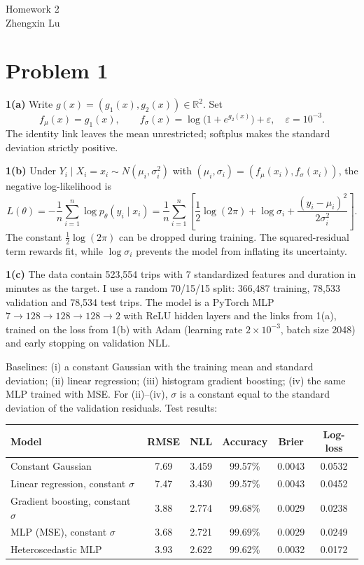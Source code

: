 \documentclass[11pt]{article}
\begin{document}
\begin{center}
{\Large Homework 2}\\[4pt]
Zhengxin Lu
\end{center}

\section*{Problem 1}

\textbf{1(a)}
Write $g(x)=(g_1(x),g_2(x))\in\mathbb{R}^2$. Set
\[
f_\mu(x)=g_1(x),\qquad f_\sigma(x)=\log\big(1+e^{g_2(x)}\big)+\varepsilon,\quad \varepsilon=10^{-3}.
\]
The identity link leaves the mean unrestricted; softplus makes the standard deviation strictly positive.

\textbf{1(b)}
Under $Y_i\mid X_i=x_i\sim N(\mu_i,\sigma_i^2)$ with $(\mu_i,\sigma_i)=(f_\mu(x_i),f_\sigma(x_i))$, the negative log-likelihood is
\[
L(\theta)=-\frac1n\sum_{i=1}^n\log p_\theta(y_i\mid x_i)
=\frac1n\sum_{i=1}^n\left[\frac12\log(2\pi)+\log\sigma_i+\frac{(y_i-\mu_i)^2}{2\sigma_i^2}\right].
\]
The constant $\frac12\log(2\pi)$ can be dropped during training. The squared-residual term rewards fit, while $\log\sigma_i$ prevents the model from inflating its uncertainty.

\textbf{1(c)}
The data contain 523,554 trips with 7 standardized features and duration in minutes as the target. I use a random 70/15/15 split: 366,487 training, 78,533 validation and 78,534 test trips. The model is a PyTorch MLP $7\to128\to128\to128\to2$ with ReLU hidden layers and the links from 1(a), trained on the loss from 1(b) with Adam (learning rate $2\times10^{-3}$, batch size 2048) and early stopping on validation NLL.

Baselines: (i) a constant Gaussian with the training mean and standard deviation; (ii) linear regression; (iii) histogram gradient boosting; (iv) the same MLP trained with MSE. For (ii)--(iv), $\sigma$ is a constant equal to the standard deviation of the validation residuals. Test results:

\begin{center}
\begin{tabular}{lccccc}
\toprule
Model & RMSE & NLL & Accuracy & Brier & Log-loss\\
\midrule
Constant Gaussian & 7.69 & 3.459 & 99.57\% & 0.0043 & 0.0532\\
Linear regression, constant $\sigma$ & 7.47 & 3.430 & 99.57\% & 0.0043 & 0.0452\\
Gradient boosting, constant $\sigma$ & 3.88 & 2.774 & 99.68\% & 0.0029 & 0.0238\\
MLP (MSE), constant $\sigma$ & 3.68 & 2.721 & 99.69\% & 0.0029 & 0.0249\\
Heteroscedastic MLP & 3.93 & 2.622 & 99.62\% & 0.0032 & 0.0172\\
\bottomrule
\end{tabular}
\end{center}
\end{document}
